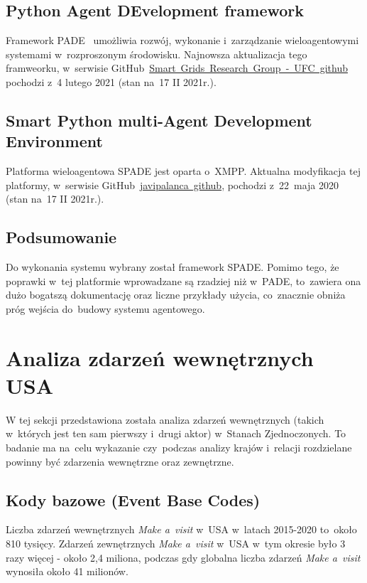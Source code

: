 \documentclass[11pt]{report}
\begin{document}
    \subsection{Python Agent DEvelopment framework}
    Framework PADE~\cite{Melo2019} umożliwia rozwój, wykonanie i~zarządzanie wieloagentowymi systemami w~rozproszonym środowisku.
    Najnowsza aktualizacja tego framweorku, w~serwisie GitHub~\href{https://github.com/grei-ufc/pade}{Smart~Grids~Research~Group~-~UFC~github} pochodzi z~4 lutego 2021 (stan na~17 II 2021r.).

    \subsection{Smart Python multi-Agent Development Environment}
    Platforma wieloagentowa SPADE jest oparta o~XMPP\cite{Saint-Andre2007}.
    Aktualna modyfikacja tej platformy, w~serwisie GitHub~\href{https://github.com/javipalanca/spade}{javipalanca~github}, pochodzi z~22~maja 2020 (stan na~17 II 2021r.).
    \enlargethispage{1\baselineskip}

    \subsection{Podsumowanie}
    Do wykonania systemu wybrany został framework SPADE\@.
    Pomimo tego, że poprawki w~tej platformie wprowadzane są rzadziej niż w~PADE, to~zawiera ona dużo bogatszą dokumentację
    oraz liczne przykłady użycia, co~znacznie obniża próg wejścia do~budowy systemu agentowego.


    \section{Analiza zdarzeń wewnętrznych USA}
    W tej sekcji przedstawiona została analiza zdarzeń wewnętrznych (takich w~których jest ten sam pierwszy i~drugi aktor) w~Stanach Zjednoczonych.
    To badanie ma na~celu wykazanie czy~podczas analizy krajów i~relacji rozdzielane powinny być zdarzenia wewnętrzne oraz zewnętrzne.

    \subsection{Kody bazowe (Event Base Codes)}\label{subsec:kody-bazowenullevent-base-codesnull}

    Liczba zdarzeń wewnętrznych \textit{Make a~visit} w~USA w~latach 2015-2020 to~około 810 tysięcy.
    Zdarzeń zewnętrznych \textit{Make a~visit} w~USA w~tym okresie było 3 razy więcej - około 2,4 miliona,
    podczas gdy globalna liczba zdarzeń \textit{Make a~visit} wynosiła około 41 milionów.
\end{document}
